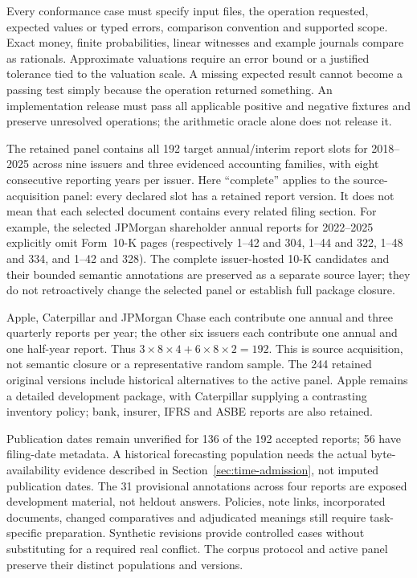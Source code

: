 Every conformance case must specify input files, the operation requested,
expected values or typed errors, comparison convention and supported scope.
Exact money, finite probabilities, linear witnesses and example journals
compare as rationals. Approximate valuations require an error bound or a
justified tolerance tied to the valuation scale. A missing expected result
cannot become a passing test simply because the operation returned something.
An implementation release must pass all applicable positive and negative
fixtures and preserve unresolved operations; the arithmetic oracle alone
does not release it.

The retained panel contains all 192 target annual/interim report slots for
2018--2025 across nine issuers and three evidenced accounting families, with
eight consecutive reporting years per issuer. Here ``complete'' applies to the
source-acquisition panel: every declared slot has a retained report version.
It does not mean that each selected document contains every related filing
section. For example, the selected JPMorgan shareholder annual reports for
2022--2025 explicitly omit Form~10-K pages (respectively 1--42 and 304,
1--44 and 322, 1--48 and 334, and 1--42 and 328). The complete issuer-hosted
10-K candidates and their bounded semantic annotations are preserved as a
separate source layer; they do not retroactively change the selected panel or
establish full package closure.

Apple, Caterpillar and JPMorgan
Chase each contribute one annual and three quarterly reports per year; the
other six issuers each contribute one annual and one half-year report. Thus
$3\times8\times4+6\times8\times2=192$. This is source acquisition, not
semantic closure or a representative random sample. The 244 retained original
versions include historical alternatives to the active panel. Apple remains
a detailed development package, with Caterpillar supplying a contrasting
inventory policy; bank, insurer, IFRS and ASBE reports are also retained.

Publication dates remain unverified for 136 of the 192 accepted reports; 56 have
filing-date metadata. A historical forecasting population needs the actual
byte-availability evidence described in Section~\ref{sec:time-admission},
not imputed publication dates. The 31 provisional annotations across four
reports are exposed development material, not heldout answers. Policies, note
links, incorporated documents, changed comparatives and adjudicated meanings
still require task-specific preparation. Synthetic revisions provide controlled
cases without substituting for a required real conflict. The corpus protocol
and active panel preserve their distinct populations and versions.

